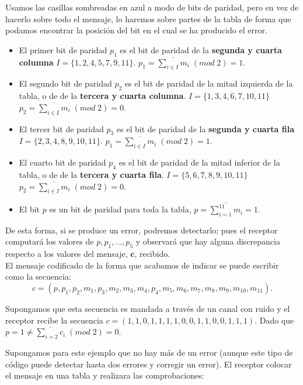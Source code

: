 \documentclass[11pt,spanish]{book}
\begin{document}
Usamos las casillas sombreadas en azul a modo de bits de paridad, pero en vez de hacerlo sobre todo el mensaje, lo haremos sobre partes de la tabla de forma que podamos encontrar la posición del bit en el cual se ha producido el error.
\begin{itemize}
    \item El primer bit de paridad \textbf{$p_{1}$} es el bit de paridad de la \textbf{segunda y cuarta columna} $I=\{1,2,4,5,7,9,11\}$. $p_{1} =\overline{\sum_{i\in I}m_{i}}\;(mod\;2) = 1$.
    \item El segundo bit de paridad \textbf{$p_{2}$} es el bit de paridad de la mitad izquierda de la tabla, o de de la \textbf{tercera y cuarta columna}. $I=\{1,3,4,6,7,10,11\}$ $p_{2} =\overline{\sum_{i\in I}m_{i}}\;(mod\;2) = 0$.
    \item El tercer bit de paridad \textbf{$p_{3}$} es el bit de paridad de la \textbf{segunda y cuarta fila} $I=\{2,3,4,8,9,10,11\}$. $p_{1} =\overline{\sum_{i\in I}m_{i}}\;(mod\;2) = 1$.
    \item El cuarto bit de paridad \textbf{$p_{4}$} es el bit de paridad de la mitad inferior de la tabla, o de de la \textbf{tercera y cuarta fila}. $I=\{5,6,7,8,9,10,11\}$ $p_{2} =\overline{\sum_{i\in I}m_{i}}\;(mod\;2) = 0$.
    \item El bit $p$ es un bit de paridad para toda la tabla, $p=\overline{\sum_{i=1}^{11}m_{i}}=1$.
\end{itemize}

De esta forma, si se produce un error, podremos detectarlo; pues el receptor computará los valores de $p,p_1,\ldots,p_5$ y observará que hay alguna discrepancia respecto a los valores del mensaje, $\mathbf{c}$, recibido.\\

El mensaje codificado de la forma que acabamos de indicar se puede escribir como la secuencia: $$c=(p,p_{1},p_2,m_1,p_3,m_2,m_3,m_4,p_4,m_5,m_6,m_7,m_8,m_9,m_{10},m_{11}).$$

Supongamos que esta secuencia es mandada a través de un canal con ruido y el receptor recibe la secuencia $c=(1,1,0,1, 1,1,1,0, 0,1,1,0, 0,1,1,1)$. Dado que $p=1\neq \overline{\sum_{i=2}c_{i}}\;(mod\;2)=0$. 

Supongamos para este ejemplo que no hay más de un error (aunque este tipo de código puede detectar hasta dos errores y corregir un error). El receptor colocar el mensaje en una tabla y realizara las comprobaciones:
\end{document}
